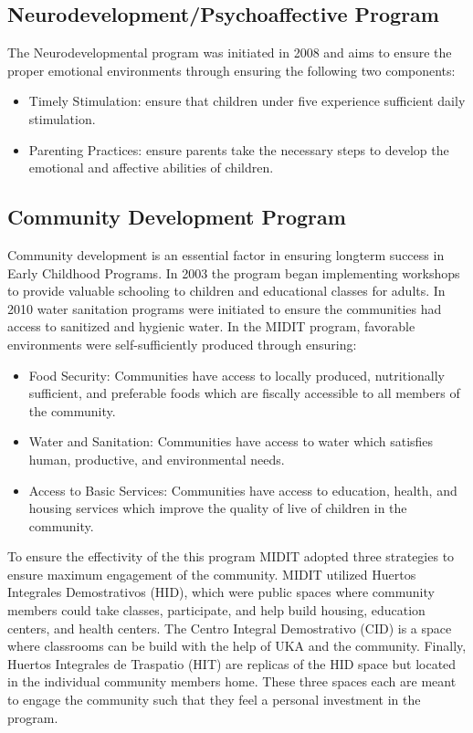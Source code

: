 \documentclass{article}
\begin{document}
\subsection{ Neurodevelopment/Psychoaffective Program}
The Neurodevelopmental program was initiated in 2008 and aims to ensure the proper emotional environments through ensuring the following two components:
\begin{itemize}
\item Timely Stimulation: ensure that children under five experience sufficient daily stimulation.
\item Parenting Practices: ensure parents take the necessary steps to develop the emotional and affective abilities of children.
\end{itemize}
\subsection{ Community Development Program}
Community development is an essential factor in ensuring longterm success in Early Childhood Programs. In 2003 the program began implementing workshops to provide valuable schooling to children and educational classes for adults. In  2010 water sanitation programs were initiated to ensure the communities had access to sanitized and hygienic water. In the MIDIT program, favorable environments were self-sufficiently produced through ensuring:
\begin{itemize}
\item Food Security: Communities have access to locally produced, nutritionally sufficient, and preferable foods which are fiscally accessible to all members of the community.
\item Water and Sanitation: Communities have access to water which satisfies human, productive, and environmental needs.
\item Access to Basic Services: Communities have access to education, health, and housing services which improve the quality of live of children in the community. 
\end{itemize}
To ensure the effectivity of the this program MIDIT adopted three strategies to ensure maximum engagement of the community. MIDIT utilized Huertos Integrales Demostrativos (HID), which were public spaces where community members could take classes, participate, and help build housing, education centers, and health centers. The Centro Integral Demostrativo (CID) is a space where classrooms can be build with the help of UKA and the community. Finally,  Huertos Integrales de Traspatio (HIT) are replicas of the HID space but located in the individual community members home. These three spaces each are meant to engage the community such that they feel a personal investment in the program.
\end{document}
